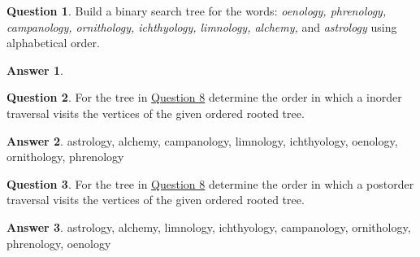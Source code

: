 \documentclass[article, 12pt]{article}
\theoremstyle{definition}
\newtheorem{question}{Question}
\newtheorem{answer}{Answer}
\begin{document}
    \begin{question}
        \label{q8}
        Build a binary search tree for the words: {\em oenology, phrenology, campanology, ornithology, ichthyology, limnology, alchemy,} and {\em astrology} using alphabetical order.   
     \end{question}

    \begin{answer} \
        \label{a8}
        \begin{figure}[H]
            \centering
        \end{figure}
    \end{answer}

    \begin{question}
        \label{q9}
        For the tree in \hyperref[a8]{Question 8} determine the order in which a inorder traversal visits the vertices of the given ordered rooted tree.    
    \end{question}

    \begin{answer}
        \label{a9}
        astrology, alchemy, campanology, limnology, ichthyology, oenology, ornithology, phrenology
    \end{answer}

    \begin{question}
        \label{q10}
        For the tree in \hyperref[a8]{Question 8} determine the order in which a postorder traversal visits the vertices of the given ordered rooted tree.
    \end{question}

    \begin{answer}
        \label{a10}
        astrology, alchemy, limnology, ichthyology, campanology, ornithology, phrenology, oenology
    \end{answer}
\end{document}
